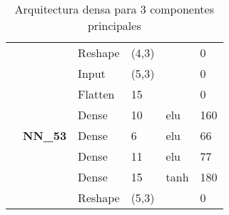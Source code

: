 \begin{table}[H]
\begin{center}
\begin{tabular}{ll|l|l|l|l|}
\multicolumn{1}{|l|}{}                                                                       &                                  & Reshape                            & (4,3)                                &                                          & 0                                           \\ \cline{2-6} 
\multicolumn{1}{|l|}{}                                                                       & \multirow{7}{*}{\textbf{NN\_53}} & Input                              & (5,3)                                &                                          & 0                                           \\ \cline{3-6} 
\multicolumn{1}{|l|}{}                                                                       &                                  & Flatten                            & 15                                   &                                          & 0                                           \\ \cline{3-6} 
\multicolumn{1}{|l|}{}                                                                       &                                  & Dense                              & 10                                   & elu                                     & 160                                         \\ \cline{3-6} 
\multicolumn{1}{|l|}{}                                                                       &                                  & Dense                              & 6                                    & elu                                     & 66                                          \\ \cline{3-6} 
\multicolumn{1}{|l|}{}                                                                       &                                  & Dense                              & 11                                   & elu                                     & 77                                          \\ \cline{3-6} 
\multicolumn{1}{|l|}{}                                                                       &                                  & Dense                              & 15                                   & tanh                                     & 180                                         \\ \cline{3-6} 
\multicolumn{1}{|l|}{}                                                                       &                                  & Reshape                            & (5,3)                                &                                          & 0                                          \\ \hline
\end{tabular}
\end{center}
\caption{Arquitectura densa para 3 componentes principales}
\label{table:nn_3}
\end{table}

